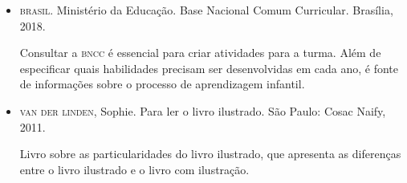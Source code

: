 \documentclass[11pt]{extarticle}
\begin{document}
\begin{itemize}
\item \textsc{brasil}. Ministério da Educação. Base Nacional Comum Curricular. Brasília, 2018.

Consultar a \textsc{bncc} é essencial para criar atividades para a turma. Além de especificar 
quais habilidades precisam ser desenvolvidas em cada ano, é fonte de informações sobre 
o processo de aprendizagem infantil. 

 
\item \textsc{van der linden}, Sophie. Para ler o livro ilustrado. São Paulo: Cosac Naify, 2011.

Livro sobre as particularidades do livro ilustrado, que apresenta as diferenças entre o livro ilustrado e o livro com ilustração. 
\end{itemize}
\end{document}
